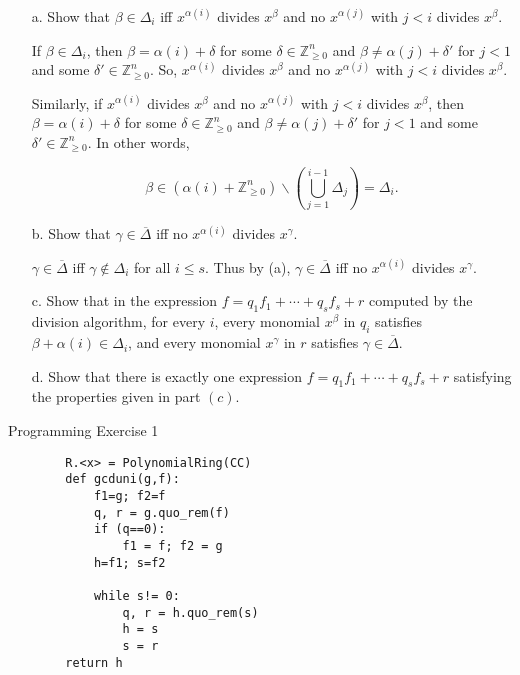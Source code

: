 \documentclass[12pt]{article}
\newcommand{\znz}{\mathbb{Z}^n_{\geq 0}}
\begin{document}
\begin{enumerate}
    \item[a.] Show that $\beta\in \Delta_i$ iff $x^{\alpha(i)}$ divides $x^{\beta}$ and no $x^{\alpha(j)}$ with $j<i$ divides $x^{\beta}$.
    \begin{mybox}
        If $\beta\in\Delta_i$, then $\beta =\alpha(i)+
        \delta$ for some $\delta\in \znz$ and $\beta\neq
        \alpha(j)+\delta'$ for $j<1$ and some
        $\delta'\in\znz$. So, $x^{\alpha(i)}$ divides
        $x^\beta$ and no $x^{\alpha(j)}$ with $j<i$
        divides $x^\beta$.

        \vspace*{2mm}
        Similarly, if $x^{\alpha(i)}$ divides
        $x^\beta$ and no $x^{\alpha(j)}$ with $j<i$
        divides $x^\beta$, then $\beta =\alpha(i)+
        \delta$ for some $\delta\in \znz$ and $\beta\neq
        \alpha(j)+\delta'$ for $j<1$ and some
        $\delta'\in\znz$. In other words,

        $$\beta\in(\alpha(i)+\mathbb{Z}^n_{\geq 0})\backslash \left(\bigcup^{i-1}_{j=1}\Delta_j\right)=\Delta_i.$$
    \end{mybox}
    \item[b.] Show that $\gamma\in \overline{\Delta}$ iff no $x^{\alpha(i)}$ divides $x^{\gamma}$.
    \begin{mybox}
        $\gamma\in \overline{\Delta}$ iff $\gamma\notin \Delta_i$
        for all $i\leq s$. Thus by (a), $\gamma\in \overline{\Delta}$
        iff no $x^{\alpha(i)}$ divides $x^\gamma$.
    \end{mybox}
    \item[c.] Show that in the expression $f=q_1f_1+\cdots + q_sf_s +r$ computed by the division algorithm, for every $i$, every monomial $x^{\beta}$ in $q_i$ satisfies $\beta +\alpha(i)\in \Delta_i$, and every monomial $x^{\gamma}$ in $r$ satisfies $\gamma\in \overline{\Delta}$.
    \begin{mybox}
        \vspace*{10mm}
    \end{mybox}
    \item[d.] Show that there is exactly one expression $f=q_1f_1+\cdots +q_sf_s+r$ satisfying the properties given in part $(c)$.
    \begin{mybox}
        \vspace*{10mm}
    \end{mybox}
\end{enumerate}

Programming Exercise 1
\begin{mybox}
    \begin{lstlisting}
        R.<x> = PolynomialRing(CC)
        def gcduni(g,f):
            f1=g; f2=f
            q, r = g.quo_rem(f)
            if (q==0):
                f1 = f; f2 = g
            h=f1; s=f2

            while s!= 0:
                q, r = h.quo_rem(s)
                h = s
                s = r
        return h
    \end{lstlisting}
\end{mybox}
\end{document}
